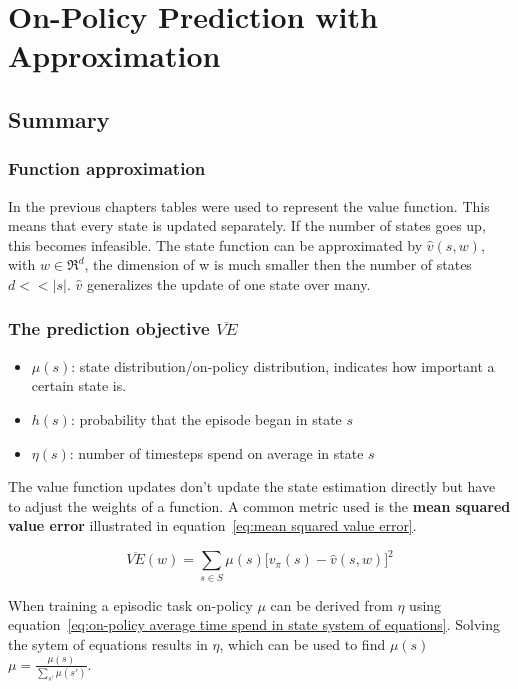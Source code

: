 \chapter{On-Policy Prediction with Approximation}

\section{Summary}

\subsection{Function approximation}
In the previous chapters tables were used to represent the value function. This means that every state is updated separately. If the number of states goes up, this becomes infeasible. The state function can be approximated by $\hat{v}(s, w)$, with $w \in \Re^d$, the dimension of w is much smaller then the number of states $d << |s|$. $\hat{v}$ generalizes the update of one state over many.

\subsection{The prediction objective $\overline{VE}$}

\begin{itemize}
	\item $\mu(s)$: state distribution/on-policy distribution, indicates how important a certain state is.
	\item $h(s)$: probability that the episode began in state $s$
	\item $\eta(s)$: number of timesteps spend on average in state $s$
\end{itemize}

The value function updates don't update the state estimation directly but have to adjust the weights of a function. A common metric used is the \textbf{mean squared value error} illustrated in equation~\ref{eq:mean squared value error}.

\begin{equation}
\overline{VE}(w) = \sum_{s \in S} \mu(s)\big[v_{\pi}(s) - \hat{v}(s, w) \big]^2
\label{eq:mean squared value error}
\end{equation}

When training a episodic task on-policy $\mu$ can be derived from $\eta$ using equation~\ref{eq:on-policy average time spend in state system of equations}. Solving the sytem of equations results in $\eta$, which can be used to find $\mu(s)$ $\mu = \frac{\mu(s)}{\sum_{s'}\mu(s')}$.

